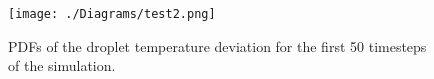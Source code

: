 \documentclass{article}
\begin{document}
\begin{figure}[h]
	\centering
	\texttt{[image: ./Diagrams/test2.png]}
	\caption{PDFs of the droplet temperature deviation for the first 50 timesteps of the simulation.}
\end{figure}
\end{document}
